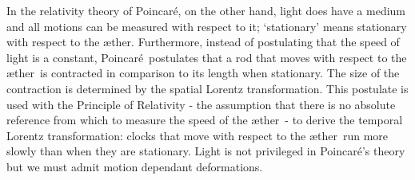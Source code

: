 \documentclass[10pt, fleqn,final,showtrims,oldfontcommands, article,a4paper,oneside]{memoir} %
\newcommand{\aether}{\ae ther}
\newcommand{\Poincare}{Poincar{\'e}}
\begin{document}
In the relativity theory of \Poincare, on the other hand,
light does have a medium and all motions can be  measured with respect to it;
`stationary' means stationary with respect to the \aether\cite{Pierseaux2005}.
Furthermore, instead of postulating that the speed of light is a constant,
\Poincare\ postulates that a rod that moves with respect to the \aether\ is contracted in comparison to its length when stationary\cite{Pierseaux2005}.
The size of the contraction is determined by the spatial Lorentz transformation.
This postulate is used with the  Principle of Relativity - the assumption that there is no absolute reference from  which to measure the speed of the \aether\ - to derive the temporal Lorentz transformation:
clocks that move with respect to the \aether\ run more  slowly than when they are stationary.
%
Light is not privileged in  \Poincare's theory
but we must admit motion dependant deformations. %
\end{document}
